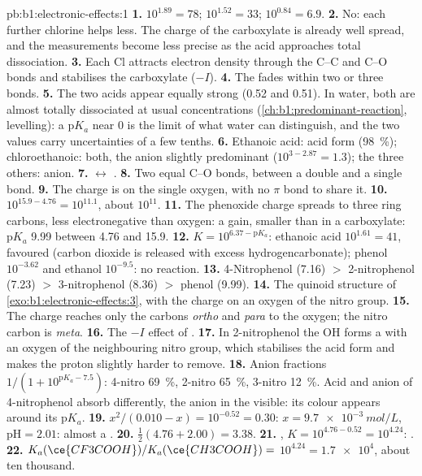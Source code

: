 \begin{solution}{pb:b1:electronic-effects:1}
\textbf{1.} $10^{1.89} = 78$; $10^{1.52} = 33$; $10^{0.84} = 6.9$.
\textbf{2.} No: each further chlorine helps less. The charge of the
carboxylate is already well spread, and the measurements become less
precise as the acid approaches total dissociation.
\textbf{3.} Each Cl attracts electron density through the C--C and C--O
bonds and stabilises the carboxylate ($-I$).
\textbf{4.} The  fades within two or three bonds.
\textbf{5.} The two acids appear equally strong (0.52 and 0.51). In water,
both are almost totally dissociated at usual concentrations
(\cref{ch:b1:predominant-reaction}, levelling): a $\mathrm{p}K_a$ near 0
is the limit of what water can distinguish, and the two values carry
uncertainties of a few tenths.
\textbf{6.} Ethanoic acid: acid form (\qty{98}{\percent}); chloroethanoic:
both, the anion slightly predominant ($10^{3 - 2.87} = 1.3$); the three
others: anion.
\textbf{7.}  $\leftrightarrow$ .
\textbf{8.} Two equal C--O bonds, between a double and a single bond.
\textbf{9.} The charge is on the single oxygen, with no $\pi$ bond to share
it.
\textbf{10.} $10^{15.9 - 4.76} = 10^{11.1}$, about $10^{11}$.
\textbf{11.} The phenoxide charge spreads to three ring carbons, less
electronegative than oxygen: a gain, smaller than in a carboxylate:
$\mathrm{p}K_a$ 9.99 between 4.76 and 15.9.
\textbf{12.} $K = 10^{6.37 - \mathrm{p}K_a}$: ethanoic acid $10^{1.61} = 41$,
favoured (carbon dioxide is released with excess hydrogencarbonate);
phenol $10^{-3.62}$ and ethanol $10^{-9.5}$: no reaction.
\textbf{13.} 4-Nitrophenol (7.16) $>$ 2-nitrophenol (7.23) $>$ 3-nitrophenol
(8.36) $>$ phenol (9.99).
\textbf{14.} The quinoid structure of \cref{exo:b1:electronic-effects:3},
with the charge on an oxygen of the nitro group.
\textbf{15.} The charge reaches only the carbons \textit{ortho} and
\textit{para} to the oxygen; the nitro carbon is \textit{meta}.
\textbf{16.} The $-I$ effect of .
\textbf{17.} In 2-nitrophenol the OH forms a  with an oxygen
of the neighbouring nitro group, which stabilises the acid form and makes
the proton slightly harder to remove.
\textbf{18.} Anion fractions $1/(1 + 10^{\mathrm{p}K_a - 7.5})$: 4-nitro
\qty{69}{\percent}, 2-nitro \qty{65}{\percent}, 3-nitro
\qty{12}{\percent}. Acid and anion of 4-nitrophenol absorb differently,
the anion in the visible: its colour appears around its $\mathrm{p}K_a$.
\textbf{19.} $x^2/(0.010 - x) = 10^{-0.52} = 0.30$: $x = \qty{9.7e-3}{mol/L}$,
$\mathrm{pH} = 2.01$: almost a .
\textbf{20.} $\frac12(4.76 + 2.00) = 3.38$.
\textbf{21.} , $K = 10^{4.76 -
0.52} = 10^{4.24}$: .
\textbf{22.} $K_a(\ce{CF3COOH})/K_a(\ce{CH3COOH}) =$ \textbf{$10^{4.24} =
\num{1.7e4}$}, about ten thousand.
\end{solution}

